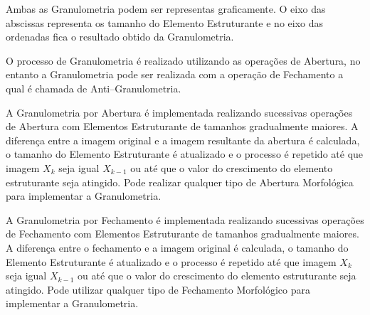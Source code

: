 Ambas as Granulometria podem ser representas graficamente. O eixo das abscissas representa os tamanho do Elemento Estruturante e no eixo das ordenadas fica o resultado obtido da Granulometria.

O processo de Granulometria é realizado utilizando as operações de Abertura, no entanto a Granulometria pode ser realizada com a operação de Fechamento a qual é chamada de Anti--Granulometria. 

A Granulometria por Abertura é implementada realizando sucessivas operações de Abertura com Elementos Estruturante de tamanhos gradualmente maiores. A diferença entre a imagem original e a imagem resultante da abertura é calculada, o tamanho do Elemento Estruturante é atualizado e o processo é repetido até que imagem $X_k$ seja igual $X_{k-1}$ ou até que o valor do crescimento do elemento estruturante seja atingido. Pode realizar qualquer tipo de Abertura Morfológica para implementar a Granulometria.

A Granulometria por Fechamento é implementada realizando sucessivas operações de Fechamento com Elementos Estruturante de tamanhos gradualmente maiores. A diferença entre o fechamento e a imagem original é calculada, o tamanho do Elemento Estruturante é atualizado e o processo é repetido até que imagem $X_k$ seja igual $X_{k-1}$ ou até que o valor do crescimento do elemento estruturante seja atingido. Pode utilizar qualquer tipo de Fechamento Morfológico para implementar a Granulometria.
